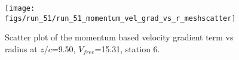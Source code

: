 \begin{figure}[H]
\centering
\texttt{[image: figs/run\_51/run\_51\_momentum\_vel\_grad\_vs\_r\_meshscatter]}
\caption{Scatter plot of the momentum based velocity gradient term vs radius at $z/c$=9.50, $V_{free}$=15.31, station 6.}
\label{fig:run_51_momentum_vel_grad_vs_r_meshscatter}
\end{figure}


